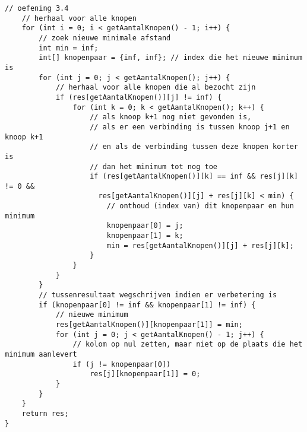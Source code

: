 \begin{oef}
\begin{opl}
\begin{lstlisting}[caption={Dijkstra}, label=Dijkstra]
    // oefening 3.4
    // herhaal voor alle knopen
    for (int i = 0; i < getAantalKnopen() - 1; i++) {
        // zoek nieuwe minimale afstand
        int min = inf;
        int[] knopenpaar = {inf, inf}; // index die het nieuwe minimum is
        for (int j = 0; j < getAantalKnopen(); j++) {
            // herhaal voor alle knopen die al bezocht zijn
            if (res[getAantalKnopen()][j] != inf) {
                for (int k = 0; k < getAantalKnopen(); k++) {
                    // als knoop k+1 nog niet gevonden is,
                    // als er een verbinding is tussen knoop j+1 en knoop k+1
                    // en als de verbinding tussen deze knopen korter is 
                    // dan het minimum tot nog toe
                    if (res[getAantalKnopen()][k] == inf && res[j][k] != 0 && 
                      res[getAantalKnopen()][j] + res[j][k] < min) {
                        // onthoud (index van) dit knopenpaar en hun minimum
                        knopenpaar[0] = j;
                        knopenpaar[1] = k;
                        min = res[getAantalKnopen()][j] + res[j][k];
                    }
                }
            }
        }
        // tussenresultaat wegschrijven indien er verbetering is
        if (knopenpaar[0] != inf && knopenpaar[1] != inf) {
            // nieuwe minimum
            res[getAantalKnopen()][knopenpaar[1]] = min;
            for (int j = 0; j < getAantalKnopen() - 1; j++) {
                // kolom op nul zetten, maar niet op de plaats die het minimum aanlevert
                if (j != knopenpaar[0])
                    res[j][knopenpaar[1]] = 0;
            }
        }
    }
    return res;
}
\end{lstlisting}
\end{opl}

\end{oef}

